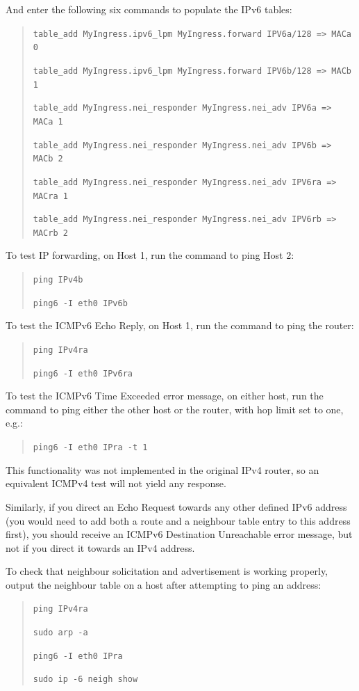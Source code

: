 And enter the following six commands to populate the IPv6 tables:
\begin{quote}
    \texttt{table\_add MyIngress.ipv6\_lpm MyIngress.forward IPV6a/128 => MACa 0}
    
    \texttt{table\_add MyIngress.ipv6\_lpm MyIngress.forward IPV6b/128 => MACb 1}
    
    \texttt{table\_add MyIngress.nei\_responder MyIngress.nei\_adv IPV6a => MACa 1}
    
    \texttt{table\_add MyIngress.nei\_responder MyIngress.nei\_adv IPV6b => MACb 2}
    
    \texttt{table\_add MyIngress.nei\_responder MyIngress.nei\_adv IPV6ra => MACra 1}
    
    \texttt{table\_add MyIngress.nei\_responder MyIngress.nei\_adv IPV6rb => MACrb 2}
\end{quote}

To test IP forwarding, on Host 1, run the command to ping Host 2:
\begin{quote}
    \texttt{ping IPv4b}
    
    \texttt{ping6 -I eth0 IPv6b}
\end{quote}

To test the ICMPv6 Echo Reply, on Host 1, run the command to ping the router:
\begin{quote}
    \texttt{ping IPv4ra}
    
    \texttt{ping6 -I eth0 IPv6ra}
\end{quote}

To test the ICMPv6 Time Exceeded error message, on either host, run the command to ping either the other host or the router, with hop limit set to one, e.g.:
\begin{quote}
    \texttt{ping6 -I eth0 IPra -t 1}
\end{quote}

This functionality was not implemented in the original IPv4 router, so an equivalent ICMPv4 test will not yield any response. 

Similarly, if you direct an Echo Request towards any other defined IPv6 address (you would need to add both a route and a neighbour table entry to this address first), you should receive an ICMPv6 Destination Unreachable error message, but not if you direct it towards an IPv4 address.

To check that neighbour solicitation and advertisement is working properly, output the neighbour table on a host after attempting to ping an address:
\begin{quote}
    \texttt{ping IPv4ra}
    
    \texttt{sudo arp -a}
    
    \texttt{ping6 -I eth0 IPra}
    
    \texttt{sudo ip -6 neigh show}
\end{quote}